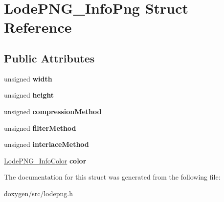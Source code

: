\hypertarget{struct_lode_p_n_g___info_png}{}\section{Lode\+P\+N\+G\+\_\+\+Info\+Png Struct Reference}
\label{struct_lode_p_n_g___info_png}
\subsection*{Public Attributes}
\begin{DoxyCompactItemize}
\item 
\mbox{\label{struct_lode_p_n_g___info_png_a74be99b177b28f3178c02139c4b7f149}} 
unsigned {\bfseries width}
\item 
\mbox{\label{struct_lode_p_n_g___info_png_a4b87ec9649e7177af7a5f5e08e5bc491}} 
unsigned {\bfseries height}
\item 
\mbox{\label{struct_lode_p_n_g___info_png_a177065a8eeb66398a89ed93e7c2b2f50}} 
unsigned {\bfseries compression\+Method}
\item 
\mbox{\label{struct_lode_p_n_g___info_png_a101ffbacd7026dad4ab062e984cecf17}} 
unsigned {\bfseries filter\+Method}
\item 
\mbox{\label{struct_lode_p_n_g___info_png_ad261cbe064eb69a92638e880d99347ca}} 
unsigned {\bfseries interlace\+Method}
\item 
\mbox{\label{struct_lode_p_n_g___info_png_acce58518f72f42ba94db4c1cfd69336b}} 
\mbox{\hyperlink{struct_lode_p_n_g___info_color}{Lode\+P\+N\+G\+\_\+\+Info\+Color}} {\bfseries color}
\end{DoxyCompactItemize}


The documentation for this struct was generated from the following file\+:\begin{DoxyCompactItemize}
\item 
doxygen/src/lodepng.\+h\end{DoxyCompactItemize}
